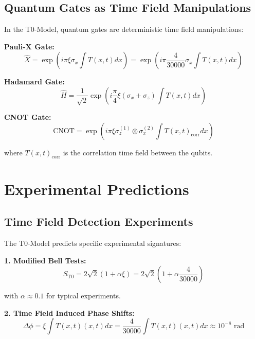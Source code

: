 \documentclass[12pt,a4paper]{report}
\newcommand{\Tfield}{T(x,t)}  %
\newcommand{\xipar}{\xi}      %
\begin{document}
	\subsection{Quantum Gates as Time Field Manipulations}\label{subsec:quantum_gates_timefield}
	
	In the T0-Model, quantum gates are deterministic time field manipulations:
	
	\textbf{Pauli-X Gate:}
	\begin{equation}
		\hat{X} = \exp\left(i\pi \xipar \sigma_x \int \Tfield dx\right) = \exp\left(i\pi \frac{4}{30000} \sigma_x \int \Tfield dx\right)
	\end{equation}
	
	\textbf{Hadamard Gate:}
	\begin{equation}
		\hat{H} = \frac{1}{\sqrt{2}} \exp\left(i\frac{\pi}{4} \xipar (\sigma_x + \sigma_z) \int \Tfield dx\right)
	\end{equation}
	
	\textbf{CNOT Gate:}
	\begin{equation}
		\text{CNOT} = \exp\left(i\pi \xipar \sigma_z^{(1)} \otimes \sigma_x^{(2)} \int \Tfield_{\text{corr}} dx\right)
	\end{equation}
	
	where $\Tfield_{\text{corr}}$ is the correlation time field between the qubits.
	
	\section{Experimental Predictions}\label{sec:experimental_predictions}
	
	\subsection{Time Field Detection Experiments}\label{subsec:timefield_detection}
	
	The T0-Model predicts specific experimental signatures:
	
	\textbf{1. Modified Bell Tests:}
	\begin{equation}
		S_{\text{T0}} = 2\sqrt{2} \left(1 + \alpha \xipar\right) = 2\sqrt{2} \left(1 + \alpha \frac{4}{30000}\right)
	\end{equation}
	
	with $\alpha \approx 0.1$ for typical experiments.
	
	\textbf{2. Time Field Induced Phase Shifts:}
	\begin{equation}
		\Delta \phi = \xipar \int \Tfield(x,t) dx = \frac{4}{30000} \int \Tfield(x,t) dx \approx 10^{-8} \text{ rad}
	\end{equation}
	
\end{document}

